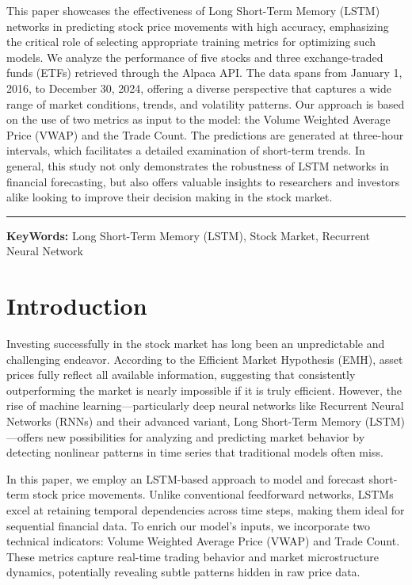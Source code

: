 \documentclass[10pt,a4paper]{article}
\begin{document}
This paper showcases the effectiveness of Long Short-Term Memory (LSTM) networks in predicting stock price movements with high accuracy, emphasizing the critical role of selecting appropriate training metrics for optimizing such models. We analyze the performance of five stocks and three exchange-traded funds (ETFs) retrieved through the Alpaca API. The data spans from January 1, 2016, to December 30, 2024, offering a diverse perspective that captures a wide range of market conditions, trends, and volatility patterns.
Our approach is based on the use of two metrics as input to the model: the Volume Weighted Average Price (VWAP) and the Trade Count. The predictions are generated at three-hour intervals, which facilitates a detailed examination of short-term trends.
In general, this study not only demonstrates the robustness of LSTM networks in financial forecasting, but also offers valuable insights to researchers and investors alike looking to improve their decision making in the stock market.

\vspace{0.5mm}
\noindent\rule{\textwidth}{1pt}

\textbf{KeyWords:} Long Short-Term Memory (LSTM), Stock Market, Recurrent Neural Network 

\newpage


\section{Introduction}

Investing successfully in the stock market has long been an unpredictable and challenging endeavor. According to the Efficient Market Hypothesis (EMH), asset prices fully reflect all available information, suggesting that consistently outperforming the market is nearly impossible if it is truly efficient. However, the rise of machine learning—particularly deep neural networks like Recurrent Neural Networks (RNNs) and their advanced variant, Long Short-Term Memory (LSTM)—offers new possibilities for analyzing and predicting market behavior by detecting nonlinear patterns in time series that traditional models often miss.

In this paper, we employ an LSTM-based approach to model and forecast short-term stock price movements. Unlike conventional feedforward networks, LSTMs excel at retaining temporal dependencies across time steps, making them ideal for sequential financial data. To enrich our model’s inputs, we incorporate two technical indicators: Volume Weighted Average Price (VWAP) and Trade Count. These metrics capture real-time trading behavior and market microstructure dynamics, potentially revealing subtle patterns hidden in raw price data.
\end{document}
